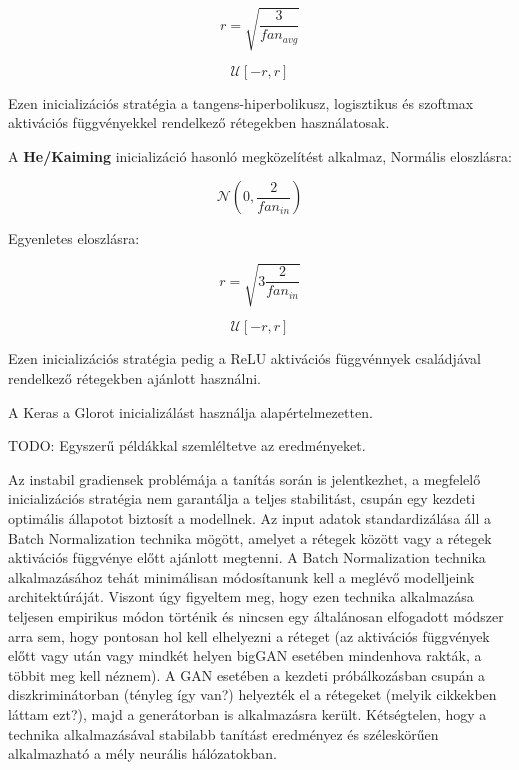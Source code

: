 $$r = \sqrt{\frac{3}{fan_{avg}}}$$

$$ \mathcal{U}\left[-r, r\right] $$

Ezen inicializációs stratégia a tangens-hiperbolikusz, logisztikus és szoftmax aktivációs függvényekkel rendelkező rétegekben használatosak. 

A \textbf{He/Kaiming} inicializáció hasonló megközelítést alkalmaz,
Normális eloszlásra:

$$ \mathcal{N}(0, \frac{2}{fan_{in}}) $$

Egyenletes eloszlásra:

$$r = \sqrt{3\frac{2}{fan_{in}}}$$

$$ \mathcal{U}\left[-r, r\right] $$

Ezen inicializációs stratégia pedig a ReLU aktivációs függvénnyek családjával rendelkező rétegekben ajánlott használni.

A Keras a Glorot inicializálást használja alapértelmezetten.

TODO: Egyszerű példákkal szemléltetve az eredményeket.


Az instabil gradiensek problémája a tanítás során is jelentkezhet, a megfelelő inicializációs stratégia nem garantálja a teljes stabilitást, csupán egy kezdeti optimális állapotot biztosít a modellnek.
Az input adatok standardizálása áll a Batch Normalization technika mögött, amelyet a rétegek között vagy a rétegek aktivációs függvénye előtt ajánlott megtenni. A Batch Normalization technika alkalmazásához tehát minimálisan módosítanunk kell a meglévő modelljeink architektúráját. Viszont úgy figyeltem meg, hogy ezen technika alkalmazása teljesen empirikus módon történik és nincsen egy általánosan elfogadott módszer arra sem, hogy pontosan hol kell elhelyezni a réteget (az aktivációs függvények előtt vagy után vagy mindkét helyen bigGAN esetében mindenhova rakták, a többit meg kell néznem). A GAN esetében a kezdeti próbálkozásban csupán a diszkriminátorban (tényleg így van?) helyezték el a rétegeket (melyik cikkekben láttam ezt?), majd a generátorban is alkalmazásra került. Kétségtelen, hogy a technika alkalmazásával stabilabb tanítást eredményez és széleskörűen alkalmazható a mély neurális hálózatokban.

